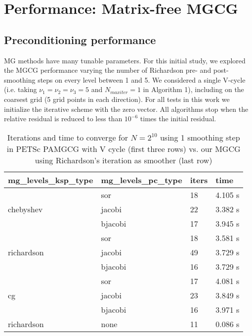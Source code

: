 \section{Performance: Matrix-free MGCG}\label{sec: conjugate}
\subsection{Preconditioning performance}
MG methods have many tunable parameters. For this initial study, we explored the MGCG performance varying the number of Richardson pre- and post-smoothing steps on every level between 1 and 5. We considered a single V-cycle (i.e. taking $\nu_1 = \nu_2 = \nu_3 = 5$ and $N_{maxiter} = 1$ in Algorithm 1), including on the coarsest grid (5 grid points in each direction). For all tests in this work we initialize the iterative scheme with the zero vector.
All algorithms stop when the relative residual is reduced to less than $10^{-6}$ times the initial residual.


\begin{table}
\caption{Iterations and time to converge for $N=2^{10}$ using 1 smoothing step in PETSc PAMGCG with V cycle (first three rows) vs. our MGCG using Richardson's iteration as smoother (last row)}
\begin{center}
\small\sf\centering
\begin{tabular}{llll}
\toprule
mg\_levels\_ksp\_type & mg\_levels\_pc\_type & iters & time \\
\midrule
\multirow{3}{*}{chebyshev}  & sor     & 18 & 4.105 s  \\ 
                            & jacobi  & 22 & 3.382 s \\ 
                            & bjacobi & 17 & 3.945 s  \\ \midrule
\multirow{3}{*}{richardson} & sor     & 18 & 3.581 s \\ 
                            & jacobi  & 49 & 3.729 s \\  
                            & bjacobi & 16 & 3.729 s \\ \midrule
\multirow{3}{*}{cg}         & sor     & 17 & 4.081 s \\ 
                            & jacobi  & 23 & 3.849 s\\ 
                            & bjacobi & 16 & 3.971 s \\ \midrule
 richardson & none & 11 & 0.086 s \\
\bottomrule
\end{tabular}
\end{center}
\label{table:petsc_1}
\end{table}

